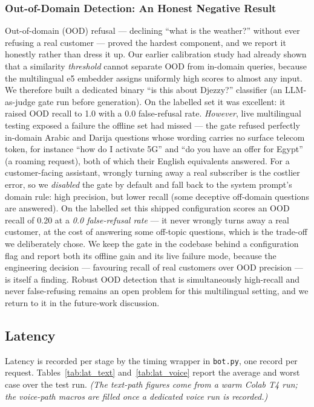 \documentclass[12pt, a4paper]{report}
\newcommand{\humantext}[1]{#1}      %
\begin{document}
\subsubsection{Out-of-Domain Detection: An Honest Negative Result}
\humantext{Out-of-domain (OOD) refusal --- declining ``what is the weather?'' without ever refusing a real customer --- proved the hardest component, and we report it honestly rather than dress it up. Our earlier calibration study had already shown that a similarity \emph{threshold} cannot separate OOD from in-domain queries, because the multilingual e5 embedder assigns uniformly high scores to almost any input. We therefore built a dedicated binary ``is this about Djezzy?'' classifier (an LLM-as-judge gate run before generation). On the labelled set it was excellent: it raised OOD recall to 1.0 with a 0.0 false-refusal rate. \emph{However}, live multilingual testing exposed a failure the offline set had missed --- the gate refused perfectly in-domain Arabic and Darija questions whose wording carries no surface telecom token, for instance ``how do I activate 5G'' and ``do you have an offer for Egypt'' (a roaming request), both of which their English equivalents answered. For a customer-facing assistant, wrongly turning away a real subscriber is the costlier error, so we \emph{disabled} the gate by default and fall back to the system prompt's domain rule: high precision, but lower recall (some deceptive off-domain questions are answered). On the labelled set this shipped configuration scores an OOD recall of 0.20 at a \emph{0.0 false-refusal rate} --- it never wrongly turns away a real customer, at the cost of answering some off-topic questions, which is the trade-off we deliberately chose. We keep the gate in the codebase behind a configuration flag and report both its offline gain and its live failure mode, because the engineering decision --- favouring recall of real customers over OOD precision --- is itself a finding. Robust OOD detection that is simultaneously high-recall and never false-refusing remains an open problem for this multilingual setting, and we return to it in the future-work discussion.}

\subsection{Latency}
\humantext{Latency is recorded per stage by the timing wrapper in \texttt{bot.py}, one record per request. Tables~\ref{tab:lat_text} and~\ref{tab:lat_voice} report the average and worst case over the test run. \emph{(The text-path figures come from a warm Colab T4 run; the voice-path macros are filled once a dedicated voice run is recorded.)}}
\end{document}
